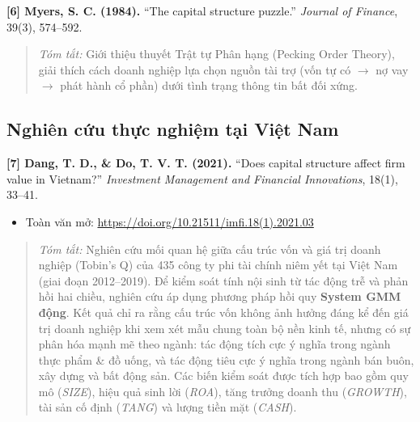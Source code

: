 \documentclass[12pt,a4paper]{article}
\begin{document}
\noindent\textbf{[6] Myers, S. C. (1984).} ``The capital structure puzzle.'' \textit{Journal of Finance}, 39(3), 574--592.
\begin{quote}
\textit{Tóm tắt:} Giới thiệu thuyết Trật tự Phân hạng (Pecking Order Theory), giải thích cách doanh nghiệp lựa chọn nguồn tài trợ (vốn tự có $\rightarrow$ nợ vay $\rightarrow$ phát hành cổ phần) dưới tình trạng thông tin bất đối xứng.
\end{quote}

\subsection*{Nghiên cứu thực nghiệm tại Việt Nam}

\noindent\textbf{[7] Dang, T. D., \& Do, T. V. T. (2021).} ``Does capital structure affect firm value in Vietnam?'' \textit{Investment Management and Financial Innovations}, 18(1), 33--41.
\begin{itemize}
    \item Toàn văn mở: \url{https://doi.org/10.21511/imfi.18(1).2021.03}
\end{itemize}
\begin{quote}
\textit{Tóm tắt:} Nghiên cứu mối quan hệ giữa cấu trúc vốn và giá trị doanh nghiệp (Tobin's Q) của 435 công ty phi tài chính niêm yết tại Việt Nam (giai đoạn 2012--2019). Để kiểm soát tính nội sinh từ tác động trễ và phản hồi hai chiều, nghiên cứu áp dụng phương pháp hồi quy \textbf{System GMM động}. Kết quả chỉ ra rằng cấu trúc vốn không ảnh hưởng đáng kể đến giá trị doanh nghiệp khi xem xét mẫu chung toàn bộ nền kinh tế, nhưng có sự phân hóa mạnh mẽ theo ngành: tác động tích cực ý nghĩa trong ngành thực phẩm \& đồ uống, và tác động tiêu cực ý nghĩa trong ngành bán buôn, xây dựng và bất động sản. Các biến kiểm soát được tích hợp bao gồm quy mô (\textit{SIZE}), hiệu quả sinh lời (\textit{ROA}), tăng trưởng doanh thu (\textit{GROWTH}), tài sản cố định (\textit{TANG}) và lượng tiền mặt (\textit{CASH}).
\end{quote}
\end{document}
